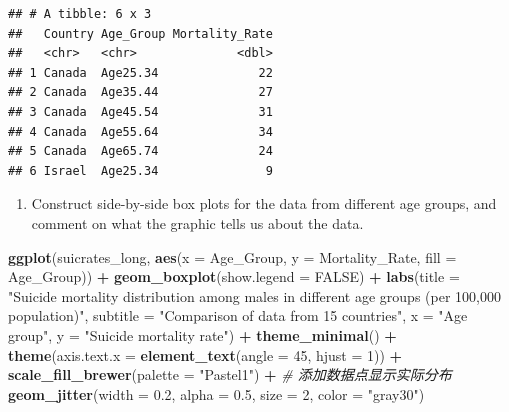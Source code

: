 \documentclass[
]{article}
\newenvironment{Shaded}{\begin{snugshade}}{\end{snugshade}}
\newcommand{\AttributeTok}[1]{\textcolor[rgb]{0.13,0.29,0.53}{#1}}
\newcommand{\CommentTok}[1]{\textcolor[rgb]{0.56,0.35,0.01}{\textit{#1}}}
\newcommand{\ConstantTok}[1]{\textcolor[rgb]{0.56,0.35,0.01}{#1}}
\newcommand{\DecValTok}[1]{\textcolor[rgb]{0.00,0.00,0.81}{#1}}
\newcommand{\FloatTok}[1]{\textcolor[rgb]{0.00,0.00,0.81}{#1}}
\newcommand{\FunctionTok}[1]{\textcolor[rgb]{0.13,0.29,0.53}{\textbf{#1}}}
\newcommand{\NormalTok}[1]{#1}
\newcommand{\SpecialCharTok}[1]{\textcolor[rgb]{0.81,0.36,0.00}{\textbf{#1}}}
\newcommand{\StringTok}[1]{\textcolor[rgb]{0.31,0.60,0.02}{#1}}
\providecommand{\tightlist}{%
  \setlength{\itemsep}{0pt}\setlength{\parskip}{0pt}}
\begin{document}
\begin{verbatim}
## # A tibble: 6 x 3
##   Country Age_Group Mortality_Rate
##   <chr>   <chr>              <dbl>
## 1 Canada  Age25.34              22
## 2 Canada  Age35.44              27
## 3 Canada  Age45.54              31
## 4 Canada  Age55.64              34
## 5 Canada  Age65.74              24
## 6 Israel  Age25.34               9
\end{verbatim}

\begin{enumerate}
\def\labelenumi{\alph{enumi}.}
\setcounter{enumi}{1}
\tightlist
\item
  Construct side-by-side box plots for the data from different age
  groups, and comment on what the graphic tells us about the data.
\end{enumerate}

\begin{Shaded}
\begin{Highlighting}[]
\FunctionTok{ggplot}\NormalTok{(suicrates\_long, }\FunctionTok{aes}\NormalTok{(}\AttributeTok{x =}\NormalTok{ Age\_Group, }\AttributeTok{y =}\NormalTok{ Mortality\_Rate, }\AttributeTok{fill =}\NormalTok{ Age\_Group)) }\SpecialCharTok{+}
  \FunctionTok{geom\_boxplot}\NormalTok{(}\AttributeTok{show.legend =} \ConstantTok{FALSE}\NormalTok{) }\SpecialCharTok{+}
  \FunctionTok{labs}\NormalTok{(}\AttributeTok{title =} \StringTok{"Suicide mortality distribution among males in different age groups (per 100,000 population)"}\NormalTok{,}
       \AttributeTok{subtitle =} \StringTok{"Comparison of data from 15 countries"}\NormalTok{,}
       \AttributeTok{x =} \StringTok{"Age group"}\NormalTok{,}
       \AttributeTok{y =} \StringTok{"Suicide mortality rate"}\NormalTok{) }\SpecialCharTok{+}
  \FunctionTok{theme\_minimal}\NormalTok{() }\SpecialCharTok{+}
  \FunctionTok{theme}\NormalTok{(}\AttributeTok{axis.text.x =} \FunctionTok{element\_text}\NormalTok{(}\AttributeTok{angle =} \DecValTok{45}\NormalTok{, }\AttributeTok{hjust =} \DecValTok{1}\NormalTok{)) }\SpecialCharTok{+}
  \FunctionTok{scale\_fill\_brewer}\NormalTok{(}\AttributeTok{palette =} \StringTok{"Pastel1"}\NormalTok{) }\SpecialCharTok{+}
  \CommentTok{\# 添加数据点显示实际分布}
  \FunctionTok{geom\_jitter}\NormalTok{(}\AttributeTok{width =} \FloatTok{0.2}\NormalTok{, }\AttributeTok{alpha =} \FloatTok{0.5}\NormalTok{, }\AttributeTok{size =} \DecValTok{2}\NormalTok{, }\AttributeTok{color =} \StringTok{"gray30"}\NormalTok{)}
\end{Highlighting}
\end{Shaded}
\end{document}
